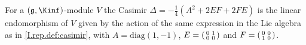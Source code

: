 For a $(\mathfrak g,\Kinf)$-module $V$ the Casimir $\Delta=-\frac14(A^2+2EF+2FE)$ is the linear endomorphism of $V$ given by the action of the same expression in the Lie algebra as in \cref{I.rep.def:casimir}, with $A=\mathrm{diag}(1,-1)$, $E=\begin{psmallmatrix}0&1\\0&0\end{psmallmatrix}$ and $F=\begin{psmallmatrix}0&0\\1&0\end{psmallmatrix}$.
